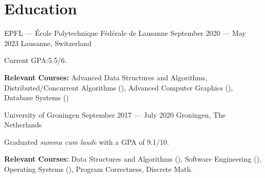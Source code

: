 \section*{Education}

\begin{cventries}
{EPFL --- École Polytechnique Fédérale de Lausanne} %
{September 2020 --- May 2023} %
{Lausanne, Switzerland} %
{%
  \begin{cvitems}
    \item Current GPA:\@ 5.5/6.
	\item \textbf{Relevant Courses:} Advanced Data Structures and Algorithms, Distributed/Concurrent Algorithms (), Advanced Computer Graphics (), Database Systems ()
  \end{cvitems}
}
{University of Groningen}  %
{September 2017 --- July 2020} %
{Groningen, The Netherlands} %
{%
  \begin{cvitems}
    \item Graduated \textit{summa cum laude} with a GPA of 9.1/10.
    \item \textbf{Relevant Courses:} Data Structures and Algorithms (), Software Engineering (), Operating Systems (), Program Correctness,  Discrete Math.
  \end{cvitems}
}
\end{cventries}
